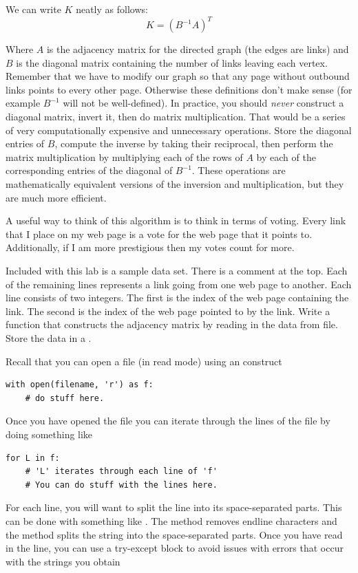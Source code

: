 We can write $K$ neatly as follows:
\[K = (B^{-1}A)^T\]

Where $A$ is the adjacency matrix for the directed graph (the edges are links) and $B$ is the diagonal matrix containing the number of links leaving each vertex.
Remember that we have to modify our graph so that any page without outbound links points to every other page.
Otherwise these definitions don't make sense (for example $B^{-1}$ will not be well-defined).
In practice, you should \textit{never} construct a diagonal matrix, invert it, then do matrix multiplication.
That would be a series of very computationally expensive and unnecessary operations.
Store the diagonal entries of $B$, compute the inverse by taking their reciprocal, then perform the matrix multiplication by multiplying each of the rows of $A$ by each of the corresponding  entries of the diagonal of $B^{-1}$.
These operations are mathematically equivalent versions of the inversion and multiplication, but they are much more efficient.

A useful way to think of this algorithm is to think in terms of voting.
Every link that I place on my web page is a vote for the web page that it points to.
Additionally, if I am more prestigious then my votes count for more.

\begin{problem}
Included with this lab is a sample data set.
There is a comment at the top.
Each of the remaining lines represents a link going from one web page to another.
Each line consists of two integers.
The first is the index of the web page containing the link.
The second is the index of the web page pointed to by the link.
Write a function that constructs the adjacency matrix by reading in the data from file.
Store the data in a .

Recall that you can open a file (in read mode) using an  construct
\begin{lstlisting}
with open(filename, 'r') as f:
    # do stuff here.
\end{lstlisting}
Once you have opened the file you can iterate through the lines of the file by doing something like
\begin{lstlisting}
for L in f:
    # 'L' iterates through each line of 'f'
    # You can do stuff with the lines here.
\end{lstlisting}
For each line, you will want to split the line into its space-separated parts.
This can be done with something like .
The  method removes endline characters and the  method splits the string into the space-separated parts.
Once you have read in the line, you can use a try-except block to avoid issues with errors that occur with the strings you obtain 
\end{problem}


